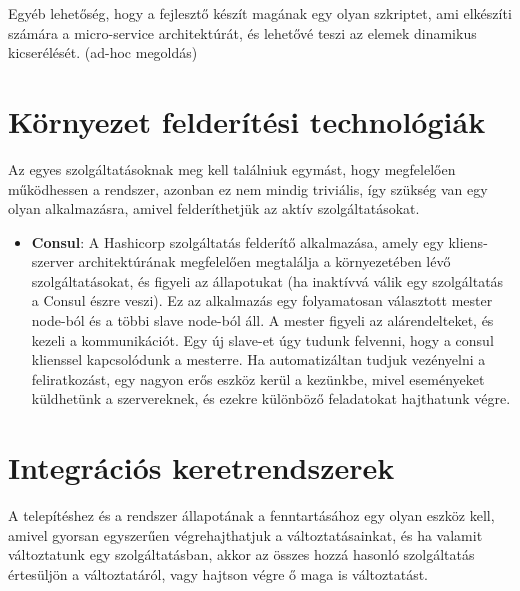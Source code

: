 \documentclass[11pt,magyar,a4paper,oneside,]{report}
\begin{document}
Egyéb lehetőség, hogy a fejlesztő készít magának egy olyan szkriptet,
ami elkészíti számára a micro-service architektúrát, és lehetővé teszi
az elemek dinamikus kicserélését. (ad-hoc megoldás)

\section{Környezet felderítési
technológiák}\label{kuxf6rnyezet-felderuxedtuxe9si-technoluxf3giuxe1k}

Az egyes szolgáltatásoknak meg kell találniuk egymást, hogy megfelelően
működhessen a rendszer, azonban ez nem mindig triviális, így szükség van
egy olyan alkalmazásra, amivel felderíthetjük az aktív szolgáltatásokat.

\begin{itemize}
\itemsep1pt\parskip0pt
\item
  \textbf{Consul}\citep{consul}: A Hashicorp szolgáltatás felderítő
  alkalmazása, amely egy kliens-szerver architektúrának megfelelően
  megtalálja a környezetében lévő szolgáltatásokat, és figyeli az
  állapotukat (ha inaktívvá válik egy szolgáltatás a Consul észre
  veszi). Ez az alkalmazás egy folyamatosan választott mester node-ból
  és a többi slave node-ból áll. A mester figyeli az alárendelteket, és
  kezeli a kommunikációt. Egy új slave-et úgy tudunk felvenni, hogy a
  consul klienssel kapcsolódunk a mesterre. Ha automatizáltan tudjuk
  vezényelni a feliratkozást, egy nagyon erős eszköz kerül a kezünkbe,
  mivel eseményeket küldhetünk a szervereknek, és ezekre különböző
  feladatokat hajthatunk végre.
\end{itemize}

\section{Integrációs
keretrendszerek}\label{integruxe1ciuxf3s-keretrendszerek}

A telepítéshez és a rendszer állapotának a fenntartásához egy olyan
eszköz kell, amivel gyorsan egyszerűen végrehajthatjuk a
változtatásainkat, és ha valamit változtatunk egy szolgáltatásban, akkor
az összes hozzá hasonló szolgáltatás értesüljön a változtatáról, vagy
hajtson végre ő maga is változtatást.
\end{document}
